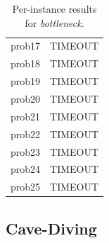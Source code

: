 \begin{table}[H]
{\begin{tabular}{lrrr rr rr rr rrrrr}
            prob17           & \multicolumn{14}{c}{TIMEOUT}                                                                                                                                    \\
            prob18           & \multicolumn{14}{c}{TIMEOUT}                                                                                                                                    \\
            prob19           & \multicolumn{14}{c}{TIMEOUT}                                                                                                                                    \\
            prob20           & \multicolumn{14}{c}{TIMEOUT}                                                                                                                                    \\
            prob21           & \multicolumn{14}{c}{TIMEOUT}                                                                                                                                    \\
            prob22           & \multicolumn{14}{c}{TIMEOUT}                                                                                                                                    \\
            prob23           & \multicolumn{14}{c}{TIMEOUT}                                                                                                                                    \\
            prob24           & \multicolumn{14}{c}{TIMEOUT}                                                                                                                                    \\
            prob25           & \multicolumn{14}{c}{TIMEOUT}                                                                                                                                    \\
            \bottomrule
        \end{tabular}%
    }
    \caption{Per-instance results for \textit{bottleneck}.}
    \label{tab:appendix_bottleneck}
\end{table}

\subsection{Cave-Diving}
\label{app:results_cavediving}

